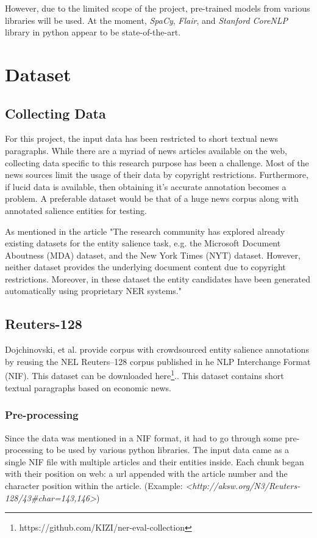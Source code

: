 \documentclass{article}
\begin{document}
		However, due to the limited scope of the project, pre-trained models from various libraries will be used. At the moment, \textit{SpaCy}, \textit{Flair}, and \textit{Stanford CoreNLP} library in python appear to be state-of-the-art.
		
	\section{Dataset}
	\subsection{Collecting Data}
		For this project, the input data has been restricted to short textual news paragraphs. While there are a myriad of news articles available on the web, collecting data specific to this research purpose has been a challenge. Most of the news sources limit the usage of their data by copyright restrictions. Furthermore, if lucid data is available, then obtaining it's accurate annotation becomes a problem. A preferable dataset would be that of a huge news corpus along with annotated salience entities for testing.
		
		As mentioned in the article \cite{Dojchinovski} "The research community has explored  already existing datasets for the entity salience task, e.g. the Microsoft Document  Aboutness (MDA) dataset, and the New York Times (NYT) dataset. However, neither dataset provides the underlying document content due to copyright restrictions.  Moreover, in these dataset the entity  candidates have been generated automatically using proprietary NER systems."
	
		\subsection{Reuters-128}
		Dojchinovski, et al. provide corpus  with  crowdsourced entity salience annotations by reusing the NEL Reuters–128 corpus published in he NLP Interchange Format (NIF). This dataset can be downloaded here\footnote[1]{https://github.com/KIZI/ner-eval-collection}.. This dataset contains short textual paragraphs based on economic news.
		
			\subsubsection{Pre-processing}
			Since the data was mentioned in a NIF format, it had to go through some pre-processing to be used by various python libraries. The input data came as a single NIF file with multiple articles and their entities inside. Each chunk began with their position on web: a url appended with the article number and the character position within the article. (Example: \textit{<http://aksw.org/N3/Reuters-128/43\#char=143,146>})
			
\end{document}
